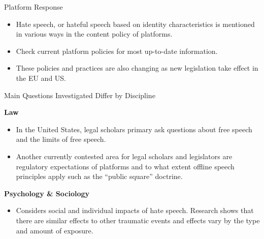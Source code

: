 \documentclass[nobackground,dvipsnames,table]{beamer}
\begin{document}
\begin{frame}{Platform Response}

\begin{itemize}
    \item Hate speech, or hateful speech based on identity characteristics is mentioned in various ways in the content policy of platforms. 
    \item Check current platform policies for most up-to-date information. 
    \item These policies and practices are also changing as new legislation take effect in the EU and US. 
\end{itemize}

\end{frame}



\begin{frame}{Main Questions Investigated Differ by Discipline}

\textbf{Law}
\begin{itemize}
    \item In the United States, legal scholars primary ask questions about free speech and the limits of free speech. 
    \item Another currently contested area for legal scholars and legislators are regulatory expectations of platforms and to what extent offline speech principles apply such as the “public square” doctrine. 
\end{itemize}

\textbf{Psychology \& Sociology}
\begin{itemize}
    \item Considers social and individual impacts of hate speech. Research shows that there are similar effects to other traumatic events and effects vary by the type and amount of exposure. 
\end{itemize}

\end{frame}
\end{document}
